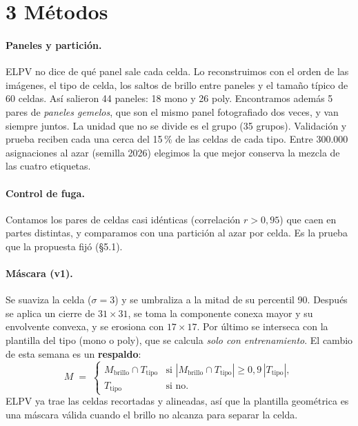 \documentclass[11pt,a4paper]{article}
\begin{document}
\section*{3 \quad Métodos}

\paragraph{Paneles y partición.} ELPV no dice de qué panel sale cada celda. Lo reconstruimos con el orden de las imágenes, el tipo de celda, los saltos de brillo entre
paneles y el tamaño típico de 60 celdas. Así salieron 44 paneles: 18 mono y 26 poly. Encontramos además 5 pares de \emph{paneles gemelos}, que son el mismo
panel fotografiado dos veces, y van siempre juntos. La unidad que no se divide es el grupo (35 grupos). Validación y prueba reciben cada una cerca del 15\,\% de
las celdas de cada tipo. Entre 300.000 asignaciones al azar (semilla 2026) elegimos la que mejor conserva la mezcla de las cuatro etiquetas.

\paragraph{Control de fuga.} Contamos los pares de celdas casi idénticas (correlación $r>0{,}95$) que caen en partes distintas, y comparamos con una partición
al azar por celda. Es la prueba que la propuesta fijó (§5.1).

\paragraph{Máscara (v1).} Se suaviza la celda ($\sigma=3$) y se umbraliza a la mitad de su percentil 90. Después se aplica un cierre de $31\times31$, se toma la
componente conexa mayor y su envolvente convexa, y se erosiona con $17\times17$. Por último se interseca con la plantilla del tipo (mono o poly), que se
calcula \emph{solo con entrenamiento}. El cambio de esta semana es un \textbf{respaldo}:
\begin{equation}
M \;=\;
\begin{cases}
M_{\text{brillo}} \cap T_{\text{tipo}} & \text{si } |M_{\text{brillo}} \cap T_{\text{tipo}}| \ge 0{,}9\,|T_{\text{tipo}}|,\\[2pt]
T_{\text{tipo}} & \text{si no.}
\end{cases}
\end{equation}
ELPV ya trae las celdas recortadas y alineadas, así que la plantilla geométrica es una máscara válida cuando el brillo no alcanza para separar la celda.
\end{document}
